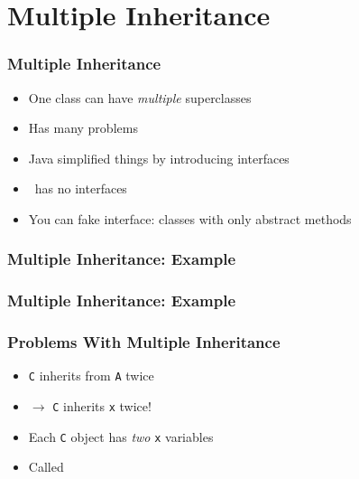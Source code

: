 \section{Multiple Inheritance}

\begin{frame}
  \tableofcontents[currentsection]
\end{frame}

\begin{frame}
  \frametitle{Multiple Inheritance}
  \begin{itemize}
    \item One class can have \emph{multiple} superclasses
    \item Has many problems
    \item Java simplified things by introducing interfaces
    \item \cpp\ has no interfaces
    \item You can fake interface: classes with only abstract methods
  \end{itemize}
\end{frame}

\begin{frame}
  \frametitle{Multiple Inheritance: Example}
\end{frame}

\begin{frame}
  \frametitle{Multiple Inheritance: Example}
\end{frame}

\begin{frame}
  \frametitle{Problems With Multiple Inheritance}
  \begin{overprint}
    \begin{center}
    \end{center}

    \begin{itemize}
      \item {\tt C} inherits from {\tt A} twice
      \item $\rightarrow$ {\tt C} inherits {\tt x} twice!
      \item Each {\tt C} object has \emph{two} {\tt x} variables
      \item Called 
    \end{itemize}
  \end{overprint}
\end{frame}

